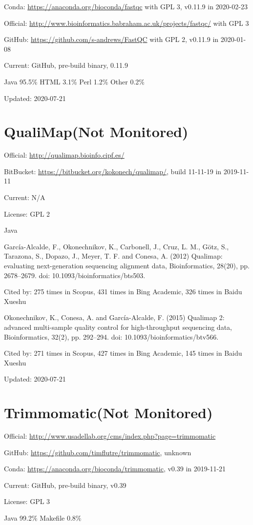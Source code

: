\documentclass[]{article}
\newcommand{\nm}{{\color{red}(Not Monitored)}}
\newcommand{\cb}[3]{\par Cited by: {\color{blue}\Huge #1} times in Scopus, {\color{blue}\Huge #2} times in Bing Academic, {\color{blue}\Huge #3} times in Baidu Xueshu}
\begin{document}
Conda: \url{https://anaconda.org/bioconda/fastqc} with GPL 3, v0.11.9 in 2020-02-23

Official: \url{http://www.bioinformatics.babraham.ac.uk/projects/fastqc/} with GPL 3

GitHub: \url{https://github.com/s-andrews/FastQC} with GPL 2, v0.11.9 in 2020-01-08

Current: GitHub, pre-build binary, 0.11.9

Java 95.5\% HTML 3.1\% Perl 1.2\% Other 0.2\%

Updated: 2020-07-21

\section{QualiMap\nm}

Official: \url{http://qualimap.bioinfo.cipf.es/}

BitBucket: \url{https://bitbucket.org/kokonech/qualimap/}, build 11-11-19 in 2019-11-11

Current: N/A

License: GPL 2

Java

García-Alcalde, F., Okonechnikov, K., Carbonell, J., Cruz, L. M., Götz, S., Tarazona, S., Dopazo, J., Meyer, T. F. and Conesa, A. (2012) Qualimap: evaluating next-generation sequencing alignment data, Bioinformatics, 28(20), pp. 2678–2679. doi: 10.1093/bioinformatics/bts503.\cb{275}{431}{326}

Okonechnikov, K., Conesa, A. and García-Alcalde, F. (2015) Qualimap 2: advanced multi-sample quality control for high-throughput sequencing data, Bioinformatics, 32(2), pp. 292–294. doi: 10.1093/bioinformatics/btv566.\cb{271}{427}{145}

Updated: 2020-07-21

\section{Trimmomatic\nm}

Official: \url{http://www.usadellab.org/cms/index.php?page=trimmomatic}

GitHub: \url{https://github.com/timflutre/trimmomatic}, unknown

Conda: \url{https://anaconda.org/bioconda/trimmomatic}, v0.39 in 2019-11-21

Current: GitHub, pre-build binary, v0.39

License: GPL 3

Java 99.2\% Makefile 0.8\%
\end{document}
